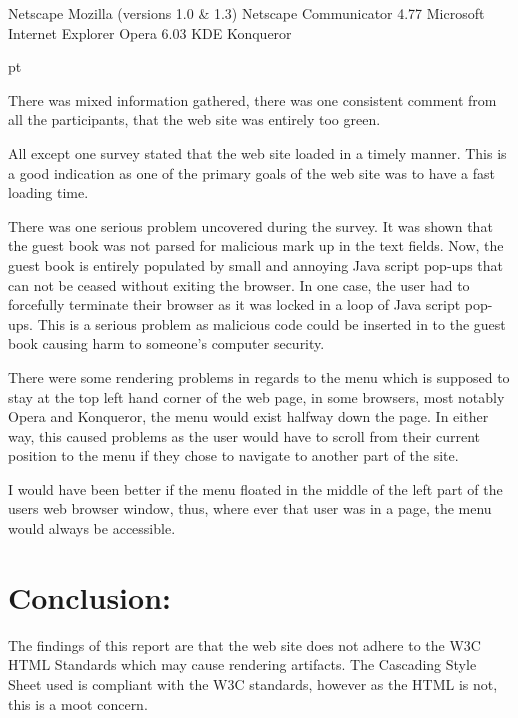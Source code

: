 \items Netscape Mozilla (versions 1.0 \& 1.3)
\items Netscape Communicator 4.77
\items Microsoft Internet Explorer
\items Opera 6.03
\items KDE Konqueror

 pt

There was mixed information gathered, there was one consistent comment from
all the participants, that the web site was entirely too green.

All except one survey stated that the web site loaded in a timely manner. This
is a good indication as one of the primary goals of the web site was to have a
fast loading time.

There was one serious problem uncovered during the survey. It was shown that
the guest book was not parsed for malicious mark up in the text fields. Now, the
guest book is entirely populated by small and annoying Java script pop-ups that
can not be ceased without exiting the browser. In one case, the user had to
forcefully terminate their browser as it was locked in a loop of Java script
pop-ups. This is a serious problem as malicious code could be inserted in to
the guest book causing harm to someone's computer security.

There were some rendering problems in regards to the menu which is supposed to
stay at the top left hand corner of the web page, in some browsers, most
notably Opera and Konqueror, the menu would exist halfway down the page. In
either way, this caused problems as the user would have to scroll from their
current position to the menu if they chose to navigate to another part of the
site.

I would have been better if the menu floated in the middle of the left part
of the users web browser window, thus, where ever that user was in a page, the
menu would always be accessible.

\section{Conclusion:}

The findings of this report are that the web site does not adhere to the W3C
HTML Standards which may cause rendering artifacts. The Cascading Style Sheet
used is compliant with the W3C standards, however as the HTML is not, this is
a moot concern.

